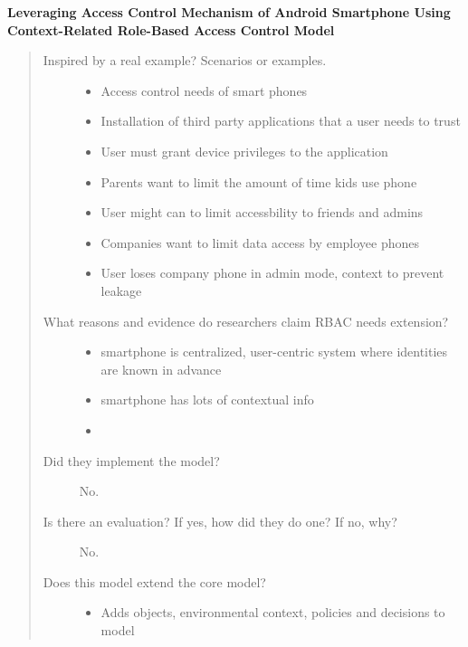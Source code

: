 \documentclass[letterpaper,10pt,english]{sphinxmanual}
\begin{document}
\textbf{Leveraging Access Control Mechanism of Android Smartphone Using Context-Related Role-Based Access Control Model}
\begin{quote}
\begin{description}
\item[{Inspired by a real example? Scenarios or examples.}] \leavevmode\begin{itemize}
\item {} 
Access control needs of smart phones

\item {} 
Installation of third party applications that a user needs to trust

\item {} 
User must grant device privileges to the application

\item {} 
Parents want to limit the amount of time kids use phone

\item {} 
User might can to limit accessbility to friends and admins

\item {} 
Companies want to limit data access by employee phones

\item {} 
User loses company phone in admin mode, context to prevent leakage

\end{itemize}

\item[{What reasons and evidence do researchers claim RBAC needs extension?}] \leavevmode\begin{itemize}
\item {} 
smartphone is centralized, user-centric system where identities are known in advance

\item {} 
smartphone has lots of contextual info

\item {} 
\end{itemize}

\item[{Did they implement the model?}] \leavevmode
No.

\item[{Is there an evaluation? If yes, how did they do one? If no, why?}] \leavevmode
No.

\item[{Does this model extend the core model?}] \leavevmode\begin{itemize}
\item {} 
Adds objects, environmental context, policies and decisions to model


\end{itemize}
\end{description}
\end{quote}
\end{document}
